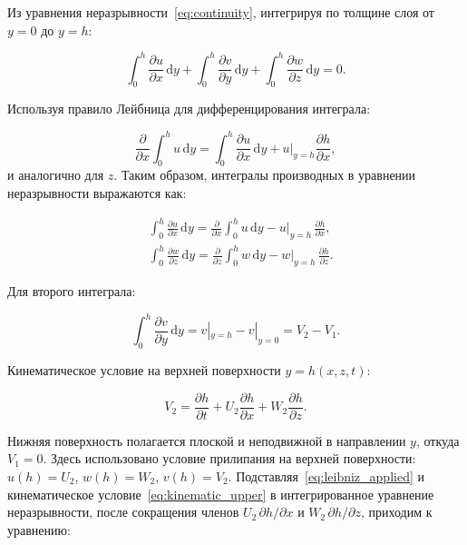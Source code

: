 Из уравнения неразрывности~\eqref{eq:continuity}, интегрируя по толщине слоя от $y = 0$ до $y = h$:

\begin{equation}
\int_0^h \frac{\partial u}{\partial x} \,\mathrm{d}y + \int_0^h \frac{\partial v}{\partial y} \,\mathrm{d}y + \int_0^h \frac{\partial w}{\partial z} \,\mathrm{d}y = 0.
\end{equation}

Используя правило Лейбница для дифференцирования интеграла:

\begin{equation}
\frac{\partial}{\partial x}\int_0^h u \,\mathrm{d}y = \int_0^h \frac{\partial u}{\partial x} \,\mathrm{d}y + u|_{y=h}\frac{\partial h}{\partial x},
\end{equation}
и аналогично для $z$. Таким образом, интегралы производных в уравнении неразрывности выражаются как:

\begin{equation}
\label{eq:leibniz_applied}
\begin{split}
&\int_0^h \frac{\partial u}{\partial x}\,\mathrm{d}y = \frac{\partial}{\partial x}\!\int_0^h u\,\mathrm{d}y
  - u\big|_{y=h}\,\frac{\partial h}{\partial x}, \\
&\int_0^h \frac{\partial w}{\partial z}\,\mathrm{d}y = \frac{\partial}{\partial z}\!\int_0^h w\,\mathrm{d}y
  - w\big|_{y=h}\,\frac{\partial h}{\partial z}.
\end{split}
\end{equation}

Для второго интеграла:

\begin{equation}
\int_0^h \frac{\partial v}{\partial y} \,\mathrm{d}y = v|_{y=h} - v|_{y=0} = V_2 - V_1.
\end{equation}

Кинематическое условие на верхней поверхности $y = h(x,z,t)$:

\begin{equation}
V_2 = \frac{\partial h}{\partial t} + U_2\frac{\partial h}{\partial x} + W_2\frac{\partial h}{\partial z}.
\label{eq:kinematic_upper}
\end{equation}

Нижняя поверхность полагается плоской и неподвижной в направлении $y$, откуда $V_1 = 0$. Здесь использовано условие прилипания на верхней поверхности: $u(h) = U_2$, $w(h) = W_2$, $v(h) = V_2$. Подставляя~\eqref{eq:leibniz_applied} и кинематическое условие~\eqref{eq:kinematic_upper} в интегрированное уравнение неразрывности, после сокращения членов $U_2\,\partial h/\partial x$ и $W_2\,\partial h/\partial z$, приходим к уравнению:

